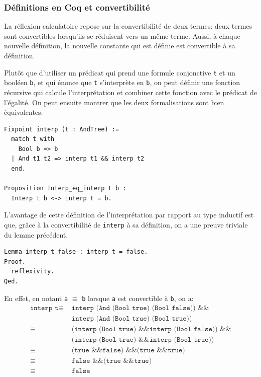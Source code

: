 \documentclass[11pt]{article}
\begin{document}
\subsubsection{Définitions en Coq et convertibilité}

La réflexion calculatoire repose sur la convertibilité de deux termes: deux termes sont convertibles lorsqu'ils se réduisent vers un même terme. Aussi, à chaque nouvelle définition, la nouvelle constante qui est définie est convertible à sa définition. \medbreak

Plutôt que d'utiliser un prédicat qui prend une formule conjonctive \texttt{t} et un booléen \texttt{b}, et qui énonce que \texttt{t} s'interprète en \texttt{b}, on peut définir une fonction récursive qui calcule l'interprétation et combiner cette fonction avec le prédicat de l'égalité. On peut ensuite montrer que les deux formalisations sont bien équivalentes.  

\begin{lstlisting}[frame=single]
Fixpoint interp (t : AndTree) :=
  match t with
    Bool b => b
  | And t1 t2 => interp t1 && interp t2
  end.
  
Proposition Interp_eq_interp t b :
  Interp t b <-> interp t = b.
\end{lstlisting}


L'avantage de cette définition de l'interprétation par rapport au type inductif est que, grâce à la convertibilité de \texttt{interp} à sa définition, on a une preuve triviale du lemme précédent.

\begin{lstlisting}[frame=single]
Lemma interp_t_false : interp t = false.
Proof.
  reflexivity.
Qed.
\end{lstlisting}

En effet, en notant \texttt{a} $\equiv$ \texttt{b} lorsque \texttt{a} est convertible à \texttt{b}, on a:
\begin{align*}
  \texttt{interp t} \equiv \,\, &\texttt{interp (And (Bool true) (Bool false)) \&\&}  \\
  \,\, &\texttt{interp (And (Bool true) (Bool true))} \\
  \equiv \,\, &\texttt{(interp (Bool true) \&\& interp (Bool false)) \&\&} \\
  \,\,&\texttt{(interp (Bool true) \&\& interp (Bool true))} \\
  \equiv \,\, &\texttt{(true \&\& false) \&\& (true \&\& true)} \\
  \equiv\,\, &\texttt{false \&\& (true \&\& true)} \\
  \equiv\,\, &\texttt{false}
\end{align*}  
\end{document}
